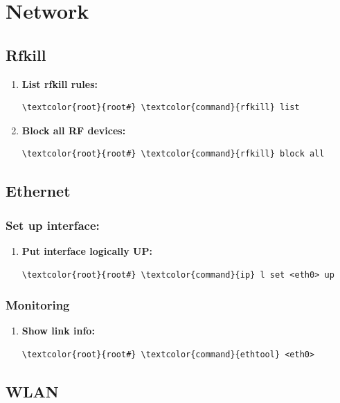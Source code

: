 \documentclass[10pt, a4paper, onecolumn, oneside, titlepage, openany]{book}
\begin{document}
\chapter{Network}
\section{Rfkill}
\begin{enumerate}
    \item \textbf{List rfkill rules:}
\begin{Verbatim}[commandchars=\\\{\}]
\textcolor{root}{root#} \textcolor{command}{rfkill} list
\end{Verbatim}
    \item \textbf{Block all RF devices:}
\begin{Verbatim}[commandchars=\\\{\}]
\textcolor{root}{root#} \textcolor{command}{rfkill} block all
\end{Verbatim}
\end{enumerate}

\section{Ethernet}
\subsection{Set up interface:}
\begin{enumerate}
    \item \textbf{Put interface logically UP:}
\begin{Verbatim}[commandchars=\\\{\}]
\textcolor{root}{root#} \textcolor{command}{ip} l set <eth0> up
\end{Verbatim}
\end{enumerate}
\subsection{Monitoring}
\begin{enumerate}
    \item \textbf{Show link info:}
\begin{Verbatim}[commandchars=\\\{\}]
\textcolor{root}{root#} \textcolor{command}{ethtool} <eth0>
\end{Verbatim}
\end{enumerate}
\section{WLAN}
\end{document}
